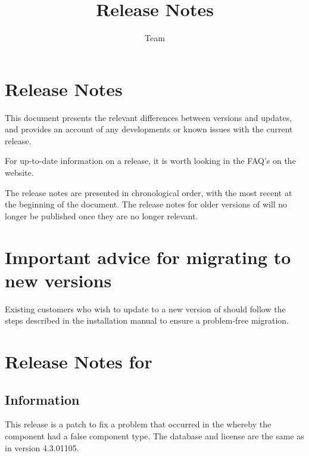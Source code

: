 \documentclass[en,a4paper,twoside,manual,guidancer]{bxreport}
\begin{document}
\title{\app{} Release Notes}
\author*{\app{} Team}{}
\maketitle

\setcounter{secnumdepth}{0}

\clearpage
\section{\app{} Release Notes}
This document presents the relevant differences between versions and updates, and provides an account of any developments or known issues with the current release. 

For up-to-date information on a release, it is worth looking in the FAQ's on the \app{} website. 

The release notes are presented in chronological order, with the most recent at the beginning of the document. The release notes for older versions of \app{}  will no longer be published once they are no longer relevant. 

\section{Important advice for migrating to new \app{} versions}
Existing customers who wish to update to a new version of \app{} should follow the steps described in the installation manual to ensure a problem-free migration.


\makeatletter
\section{Release Notes for \app{} \@bxversion}
\makeatother
\subsection{Information}
This release is a patch to fix a problem that occurred in the  whereby the  component had a false component type. The database and license are the same as in version 4.3.01105. 
\end{document}
